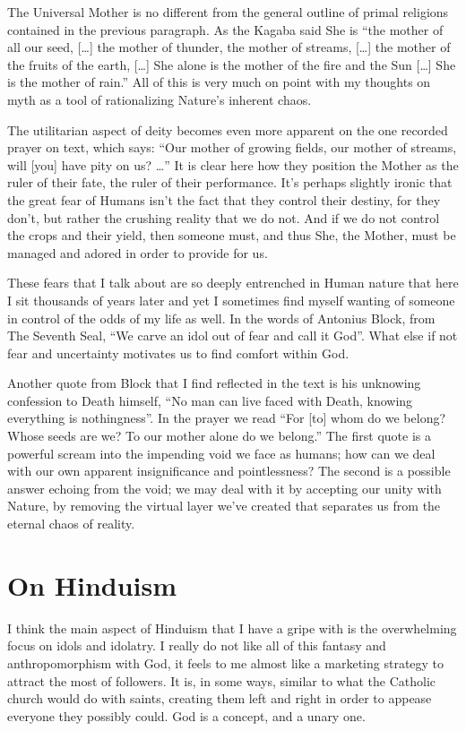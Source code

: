 \documentclass[12pt,letterpaper]{article}
\begin{document}
\begin{spacing}{2}
    The Universal Mother is no different from the general outline of primal
    religions contained in the previous paragraph. As the Kagaba said She is
    ``the mother of all our seed, [\ldots] the mother of thunder, the mother of
    streams, [\ldots] the mother of the fruits of the earth, [\ldots] She alone
    is the mother of the fire and the Sun [\ldots] She is the mother of rain.''
    All of this is very much on point with my thoughts on myth as a tool of
    rationalizing Nature's inherent chaos.

    The utilitarian aspect of deity becomes even more apparent on the one
    recorded prayer on text, which says: ``Our mother of growing fields, our
    mother of streams, will [you] have pity on us? \ldots'' It is clear here how
    they position the Mother as the ruler of their fate, the ruler of their
    performance. It's perhaps slightly ironic that the great fear of Humans
    isn't the fact that they control their destiny, for they don't, but rather
    the crushing reality that we do not. And if we do not control the crops and
    their yield, then someone must, and thus She, the Mother, must be managed
    and adored in order to provide for us.

    These fears that I talk about are so deeply entrenched in Human nature that
    here I sit thousands of years later and yet I sometimes find myself wanting
    of someone in control of the odds of my life as well. In the words of
    Antonius Block, from The Seventh Seal, ``We carve an idol out of fear and
    call it God''. What else if not fear and uncertainty motivates us to find
    comfort within God.

    Another quote from Block that I find reflected in the text is his unknowing
    confession to Death himself, ``No man can live faced with Death, knowing
    everything is nothingness''. In the prayer we read ``For [to] whom do we
    belong? Whose seeds are we? To our mother alone do we belong.'' The first
    quote is a powerful scream into the impending void we face as humans; how
    can we deal with our own apparent insignificance and pointlessness? The
    second is a possible answer echoing from the void; we may deal with it by
    accepting our unity with Nature, by removing the virtual layer we've created
    that separates us from the eternal chaos of reality.

    \newpage
    \section{On Hinduism}
    I think the main aspect of Hinduism that I have a gripe with is the
    overwhelming focus on idols and idolatry. I really do not like all of this
    fantasy and anthropomorphism with God, it feels to me almost like a
    marketing strategy to attract the most of followers. It is, in some ways,
    similar to what the Catholic church would do with saints, creating them left
    and right in order to appease everyone they possibly could. God is a
    concept, and a unary one.


\end{spacing}
\end{document}
